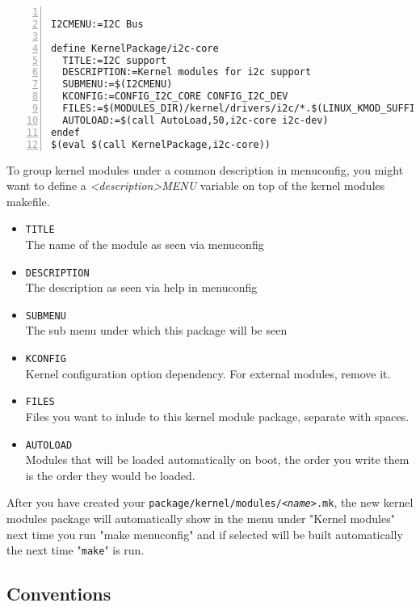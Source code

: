 \begin{Verbatim}[frame=single,numbers=left]

I2CMENU:=I2C Bus

define KernelPackage/i2c-core
  TITLE:=I2C support
  DESCRIPTION:=Kernel modules for i2c support
  SUBMENU:=$(I2CMENU)
  KCONFIG:=CONFIG_I2C_CORE CONFIG_I2C_DEV
  FILES:=$(MODULES_DIR)/kernel/drivers/i2c/*.$(LINUX_KMOD_SUFFIX)
  AUTOLOAD:=$(call AutoLoad,50,i2c-core i2c-dev)
endef
$(eval $(call KernelPackage,i2c-core))
\end{Verbatim}

To group kernel modules under a common description in menuconfig, you might want to define a \textit{<description>MENU} variable on top of the kernel modules makefile.

\begin{itemize}
    \item \texttt{TITLE} \\
        The name of the module as seen via menuconfig
    \item \texttt{DESCRIPTION} \\
        The description as seen via help in menuconfig
    \item \texttt{SUBMENU} \\
        The sub menu under which this package will be seen
    \item \texttt{KCONFIG} \\
        Kernel configuration option dependency. For external modules, remove it.
    \item \texttt{FILES} \\
        Files you want to inlude to this kernel module package, separate with spaces.
    \item \texttt{AUTOLOAD} \\
        Modules that will be loaded automatically on boot, the order you write them is the order they would be loaded.
\end{itemize}

After you have created your \texttt{package/kernel/modules/\textit{<name>}.mk}, the new kernel modules package
will automatically show in the menu under "Kernel modules" next time you run "make menuconfig" and if selected
will be built automatically the next time "\texttt{make}" is run.

\subsection{Conventions}

